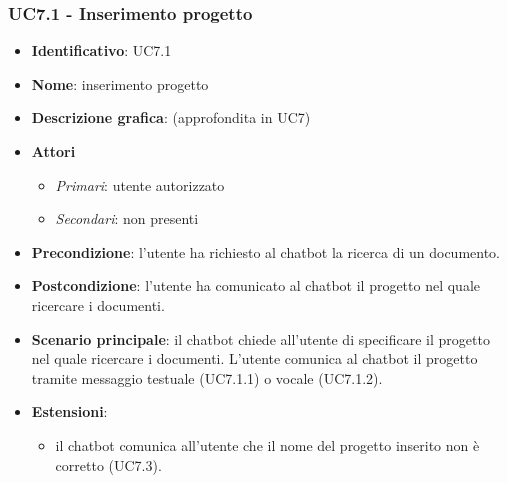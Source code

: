 \subsubsection{UC7.1 - Inserimento progetto}
\begin{itemize}
    \item \textbf{Identificativo}: UC7.1
    \item \textbf{Nome}: inserimento progetto
    \item \textbf{Descrizione grafica}: (approfondita in UC7)
    \item \textbf{Attori}
 \begin{itemize} 
    \item \textit{Primari}: utente autorizzato
    \item \textit{Secondari}: non presenti
 \end{itemize}
 \item \textbf{Precondizione}: l'utente ha richiesto al chatbot la ricerca di un documento.
 \item \textbf{Postcondizione}:  l'utente ha comunicato al chatbot il progetto nel quale ricercare i documenti.
 \item \textbf{Scenario principale}: il chatbot chiede all'utente di specificare il progetto nel quale ricercare i documenti. L'utente comunica al chatbot il progetto tramite messaggio testuale (UC7.1.1) o vocale (UC7.1.2).
 \item \textbf{Estensioni}: 
 \begin{itemize} 
    \item il chatbot comunica all'utente che il nome del progetto inserito non è corretto (UC7.3).
 \end{itemize}
\end{itemize}

